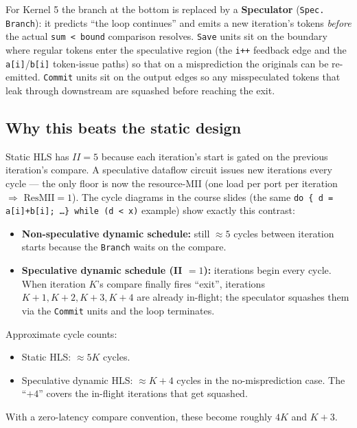 \documentclass[11pt,a4paper]{article}
\begin{document}
For Kernel 5 the branch at the bottom is replaced by a \textbf{Speculator} (\texttt{Spec. Branch}): it predicts ``the loop continues'' and emits a new iteration's tokens \emph{before} the actual \texttt{sum \textless\ bound} comparison resolves. \texttt{Save} units sit on the boundary where regular tokens enter the speculative region (the \texttt{i++} feedback edge and the \texttt{a[i]}/\texttt{b[i]} token-issue paths) so that on a misprediction the originals can be re-emitted. \texttt{Commit} units sit on the output edges so any misspeculated tokens that leak through downstream are squashed before reaching the exit.

\subsection*{Why this beats the static design}

Static HLS has $II = 5$ because each iteration's start is gated on the previous iteration's compare. A speculative dataflow circuit issues new iterations every cycle --- the only floor is now the resource-MII (one load per port per iteration $\Rightarrow$ $\mathrm{ResMII} = 1$). The cycle diagrams in the course slides (the same \texttt{do \{ d = a[i]+b[i]; \dots \} while (d \textless\ x)} example) show exactly this contrast:

\begin{itemize}
  \item \textbf{Non-speculative dynamic schedule:} still $\approx 5$ cycles between iteration starts because the \texttt{Branch} waits on the compare.
  \item \textbf{Speculative dynamic schedule (II $=1$):} iterations begin every cycle. When iteration $K$'s compare finally fires ``exit'', iterations $K+1, K+2, K+3, K+4$ are already in-flight; the speculator squashes them via the \texttt{Commit} units and the loop terminates.
\end{itemize}

Approximate cycle counts:

\begin{itemize}[noitemsep]
  \item Static HLS: $\approx 5K$ cycles.
  \item Speculative dynamic HLS: $\approx K + 4$ cycles in the no-misprediction case. The ``$+4$'' covers the in-flight iterations that get squashed.
\end{itemize}

With a zero-latency compare convention, these become roughly $4K$ and $K+3$.
\end{document}
